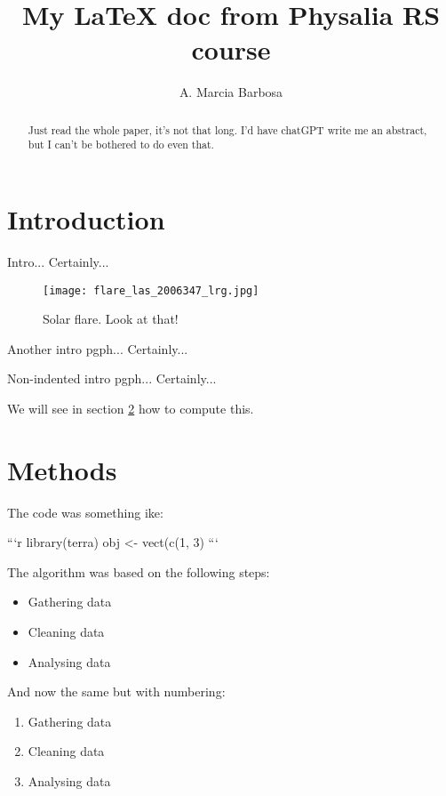 \documentclass[12pt, a4paper]{article}
\title{My LaTeX doc from Physalia RS course}
\author{A. Marcia Barbosa}
\begin{document}
\maketitle

\tableofcontents{}

\begin{abstract}
\noindent Just read the whole paper, it's not that long. I'd have chatGPT write me an abstract, but I can't be bothered to do even that.
\end{abstract}


\section{Introduction}
Intro... Certainly...

\begin{figure}
    \centering    \texttt{[image: flare\_las\_2006347\_lrg.jpg]}
    \caption{Solar flare. Look at that!}
    \label{fig:flare}
\end{figure}

Another intro pgph... Certainly...

\noindent Non-indented intro pgph... Certainly...

We will see in section \ref{sec:methods} how to compute this.

\section{Methods}\label{sec:methods}

The code was something ike:

\begin{markdown}

```r
library(terra)
obj <- vect(c(1, 3)
```
\end{markdown}


The algorithm was based on the following steps:

\begin{itemize}
    \item Gathering data
    \item Cleaning data
    \item Analysing data
\end{itemize}

And now the same but with numbering:

\begin{enumerate}
    \item Gathering data
    \item Cleaning data
    \item Analysing data
\end{enumerate}
\end{document}
